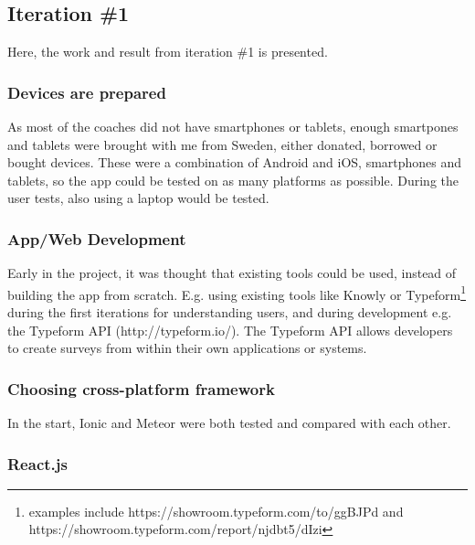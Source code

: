\subsection{Iteration \#1}
Here, the work and result from iteration \#1 is presented.

\subsubsection{Devices are prepared}
As most of the coaches did not have smartphones or tablets, enough smartpones and tablets were brought with me from Sweden, either donated, borrowed or bought devices. These were a combination of Android and iOS, smartphones and tablets, so the app could be tested on as many platforms as possible. During the user tests, also using a laptop would be tested.

\subsubsection{App/Web Development}
Early in the project, it was thought that existing tools could be used, instead of building the app from scratch. E.g. using existing tools like Knowly or Typeform\footnote{examples include https://showroom.typeform.com/to/ggBJPd and https://showroom.typeform.com/report/njdbt5/dIzi} during the first iterations for understanding users, and during development e.g. the Typeform API (http://typeform.io/). The Typeform API allows developers to create surveys from within their own applications or systems.

\subsubsection{Choosing cross-platform framework}

In the start, Ionic and Meteor were both tested and compared with each other.


\subsubsection{React.js}

